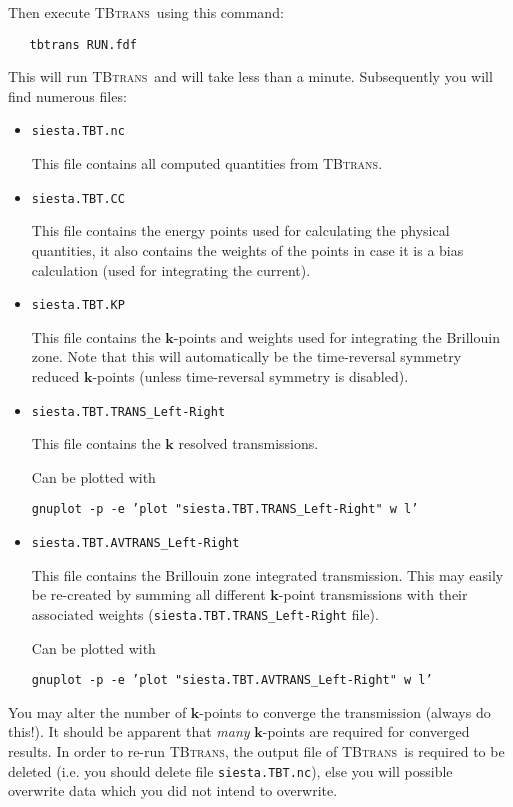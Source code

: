 \documentclass[10pt]{article}
\newcommand\tbt{\textsc{TBtrans}}
\newcommand\script[1]{\texttt{#1}}
\begin{document}
Then execute \tbt\ using this command:
\begin{verbatim}
   tbtrans RUN.fdf
\end{verbatim}
This will run \tbt\ and will take less than a minute. Subsequently you will find numerous
files:
\begin{itemize}
  \itemsep=0pt
  \parskip=0pt
  \item \script{siesta.TBT.nc}
  
  This file contains all computed quantities from \tbt. 

  \item \script{siesta.TBT.CC}

  This file contains the energy points used for calculating the physical quantities, it
  also contains the weights of the points in case it is a bias calculation (used for
  integrating the current).

  \item \script{siesta.TBT.KP}

  This file contains the $\mathbf k$-points and weights used for integrating the Brillouin
  zone. Note that this will automatically be the time-reversal symmetry reduced $\mathbf
  k$-points (unless time-reversal symmetry is disabled).

  \item \script{siesta.TBT.TRANS\_Left-Right}

  This file contains the $\mathbf k$ resolved transmissions. 

  Can be plotted with 
  \begin{center}
    \script{gnuplot -p -e 'plot "siesta.TBT.TRANS\_Left-Right" w l'}
  \end{center}

  \item \script{siesta.TBT.AVTRANS\_Left-Right}

  This file contains the Brillouin zone integrated transmission. This may easily be
  re-created by summing all different $\mathbf k$-point transmissions with their
  associated weights (\script{siesta.TBT.TRANS\_Left-Right} file).

  Can be plotted with
  \begin{center}
    \script{gnuplot -p -e 'plot "siesta.TBT.AVTRANS\_Left-Right" w l'}
  \end{center}

\end{itemize}

You may alter the number of $\mathbf k$-points to converge the transmission (always do
this!). It should be apparent that \emph{many} $\mathbf k$-points are required for
converged results. In order to re-run \tbt, the output file of \tbt\ is required to be
deleted (i.e. you should delete file \script{siesta.TBT.nc}), else you will possible
overwrite data which you did not intend to overwrite.
\end{document}
